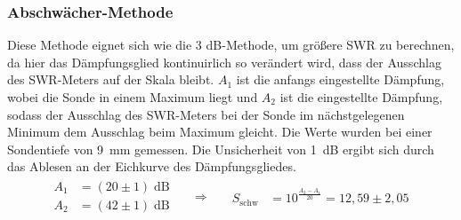     \subsubsection*{Abschwächer-Methode}
        Diese Methode eignet sich wie die 3 dB-Methode, um größere SWR zu berechnen, da hier das Dämpfungsglied kontinuirlich so verändert wird, dass der Ausschlag des SWR-Meters auf der Skala bleibt.
        $A_1$ ist die anfangs eingestellte Dämpfung, wobei die Sonde in einem Maximum liegt und $A_2$ ist die eingestellte Dämpfung, sodass der Ausschlag des SWR-Meters bei der Sonde im nächstgelegenen Minimum dem Ausschlag beim Maximum gleicht.
        Die Werte wurden bei einer Sondentiefe von \SI{9}{mm} gemessen.
        Die Unsicherheit von \SI{1}{dB} ergibt sich durch das Ablesen an der Eichkurve des Dämpfungsgliedes.
        \begin{align*}
            \begin{aligned}
                A_1 &= (20 \pm 1) \; \mathrm{dB} \\
                A_2 &= (42 \pm 1) \; \mathrm{dB}
            \end{aligned}
            && \Rightarrow && 
            \begin{aligned}
                S_{\mathrm{schw}} &= 10^{\frac{A_2 - A_1}{20}} = 12,59 \pm 2,05
            \end{aligned}
        \end{align*}
    




